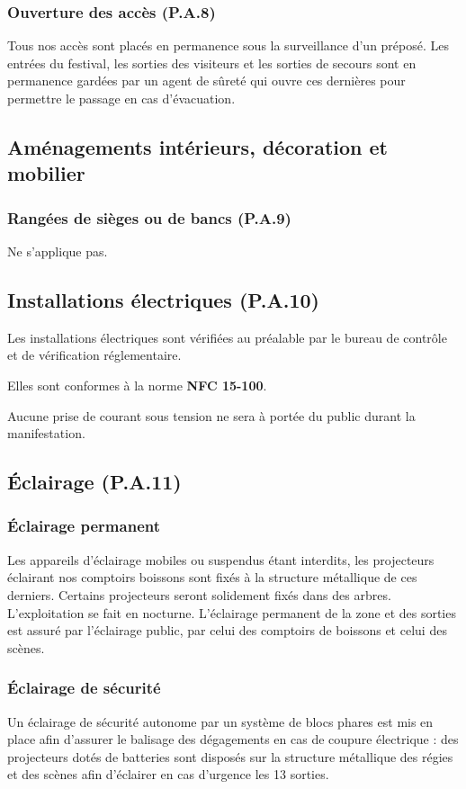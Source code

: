 \documentclass[hidelinks, paper=a4, fontsize=13pt]{report}
\begin{document}
\subsubsection{Ouverture des accès (P.A.8)}

Tous nos accès sont placés en permanence sous la surveillance d’un préposé. Les entrées du festival, les sorties des visiteurs et les sorties de secours sont en permanence gardées par un agent de sûreté qui ouvre ces dernières pour permettre le passage en cas d’évacuation.
\subsection{Aménagements intérieurs, décoration et mobilier}
\subsubsection{Rangées de sièges ou de bancs (P.A.9)}
Ne s'applique pas.
\subsection{Installations électriques (P.A.10)}
\label{InstallationsElectriques}
Les installations électriques sont vérifiées au préalable par le bureau de contrôle et de vérification réglementaire. 

Elles sont conformes à la norme \textbf{NFC 15-100}.

Aucune prise de courant sous tension ne sera à portée du public durant la manifestation.
\subsection{Éclairage (P.A.11)}
\label{Eclairage}
\subsubsection{Éclairage permanent}

Les appareils d’éclairage mobiles ou suspendus étant interdits, les projecteurs éclairant nos comptoirs boissons sont fixés à la structure métallique de ces derniers. Certains projecteurs seront solidement fixés dans des arbres.\\

L’exploitation se fait en nocturne. L’éclairage permanent de la zone et des sorties est assuré par l’éclairage public, par celui des comptoirs de boissons et celui des scènes. 

\subsubsection{Éclairage de sécurité}
Un éclairage de sécurité autonome par un système de blocs phares est mis en place afin d’assurer le balisage des dégagements en cas de coupure électrique : des projecteurs dotés de batteries sont disposés sur la structure métallique des régies et des scènes afin d’éclairer en cas d’urgence les 13 sorties. \\
\end{document}
